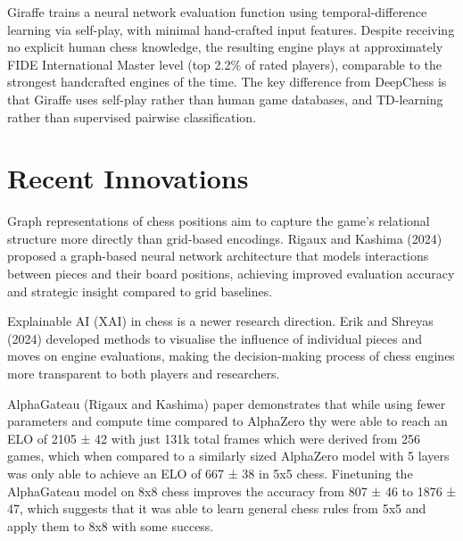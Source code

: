 Giraffe \cite{deep_learning_game_ai} trains a neural network evaluation function using temporal-difference learning via self-play, with minimal hand-crafted input features. Despite receiving no explicit human chess knowledge, the resulting engine plays at approximately FIDE International Master level (top 2.2\% of rated players), comparable to the strongest handcrafted engines of the time. The key difference from DeepChess is that Giraffe uses self-play rather than human game databases, and TD-learning rather than supervised pairwise classification.


\section{Recent Innovations}

Graph representations of chess positions \cite{gnn_chess} \cite{gnn_chess_modelling} aim to capture the game's relational structure more directly than grid-based encodings. Rigaux and Kashima (2024) \cite{gnn_chess} proposed a graph-based neural network architecture that models interactions between pieces and their board positions, achieving improved evaluation accuracy and strategic insight compared to grid baselines.

Explainable AI (XAI) \cite{xai_chess} \cite{look_ahead_chess_nn} in chess is a newer research direction. Erik and Shreyas (2024) developed methods to visualise the influence of individual pieces and moves on engine evaluations, making the decision-making process of chess engines more transparent to both players and researchers.

AlphaGateau (Rigaux and Kashima) paper \cite{gnn_chess} demonstrates that while using fewer parameters and compute time compared to AlphaZero thy were able to reach an ELO of 2105 ± 42 with just 131k total frames which were derived from 256 games, which when compared to a similarly sized AlphaZero model with 5 layers was only able to achieve an ELO of 667 ± 38 in 5x5 chess. Finetuning the AlphaGateau model on 8x8 chess improves the accuracy from 807 ± 46 to 1876 ± 47, which suggests that it was able to learn general chess rules from 5x5 and apply them to 8x8 with some success.

